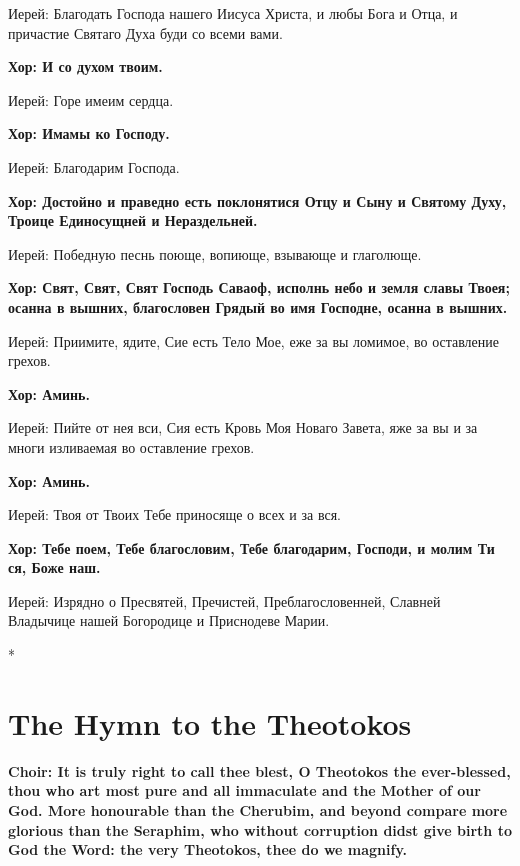 \documentclass[12pt,a4paper,titlepage]{report}
\begin{document}
\begin{paracol}[1]{2}
  Иерей: Благодать Господа нашего Иисуса Христа, и любы Бога и Отца, и причастие Святаго Духа буди со всеми вами.

  \textbf{Хор: И со духом твоим.}

  Иерей: Горе имеим сердца.

  \textbf{Хор: Имамы ко Господу.}

  Иерей: Благодарим Господа.

  \textbf{Хор: Достойно и праведно есть поклонятися Отцу и Сыну и Святому Духу, Троице Единосущней и Нераздельней.}

  Иерей: Победную песнь поюще, вопиюще, взывающе и глаголюще.

  \textbf{Хор: Свят, Свят, Свят Господь Саваоф, исполнь небо и земля славы Твоея; осанна в вышних, благословен Грядый во имя Господне, осанна в вышних.}

  Иерей: Приимите, ядите, Сие есть Тело Мое, еже за вы ломимое, во оставление грехов.

  \textbf{Хор: Аминь.}

  Иерей: Пийте от нея вси, Сия есть Кровь Моя Новаго Завета, яже за вы и за многи изливаемая во оставление грехов.

  \textbf{Хор: Аминь.}

  Иерей: Твоя от Твоих Тебе приносяще о всех и за вся.

  \textbf{Хор: Тебе поем, Тебе благословим, Тебе благодарим, Господи, и молим Ти ся, Боже наш.}

  Иерей: Изрядно о Пресвятей, Пречистей, Преблагословенней, Славней Владычице нашей Богородице и Приснодеве Марии.

  \switchcolumn[0]*

  \section*{The Hymn to the Theotokos}

  \textbf{Choir: It is truly right to call thee blest, O Theotokos the ever-blessed, thou who art most pure and all immaculate and the Mother of our God. More honourable than the Cherubim, and beyond compare more glorious than the Seraphim, who without corruption didst give birth to God the Word: the very Theotokos, thee do we magnify.}


\end{paracol}
\end{document}
